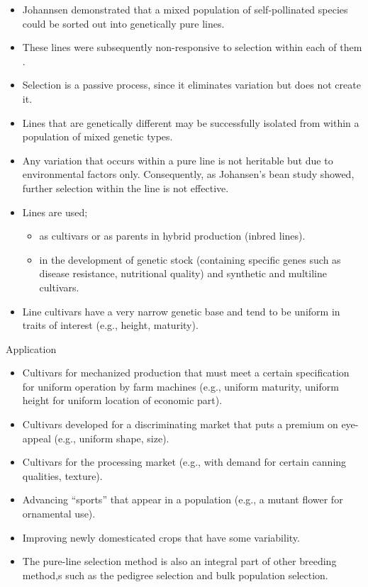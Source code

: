 \documentclass[11pt,ignorenonframetext,aspectratio=169]{beamer}
\providecommand{\tightlist}{%
  \setlength{\itemsep}{0pt}\setlength{\parskip}{0pt}}
\begin{document}
\begin{frame}{}
\protect\hypertarget{section-9}{}
\begin{itemize}
\tightlist
\item
  Johannsen demonstrated that a mixed population of self-pollinated
  species could be sorted out into genetically pure lines.
\item
  These lines were subsequently non-responsive to selection within each
  of them .
\item
  Selection is a passive process, since it eliminates variation but does
  not create it.
\item
  Lines that are genetically different may be successfully isolated from
  within a population of mixed genetic types.
\item
  Any variation that occurs within a pure line is not heritable but due
  to environmental factors only. Consequently, as Johansen's bean study
  showed, further selection within the line is not effective.
\item
  Lines are used;

  \begin{itemize}
  \tightlist
  \item
    as cultivars or as parents in hybrid production (inbred lines).
  \item
    in the development of genetic stock (containing specific genes such
    as disease resistance, nutritional quality) and synthetic and
    multiline cultivars.
  \end{itemize}
\item
  Line cultivars have a very narrow genetic base and tend to be uniform
  in traits of interest (e.g., height, maturity).
\end{itemize}
\end{frame}

\begin{frame}{Application}
\protect\hypertarget{application}{}
\begin{itemize}
\tightlist
\item
  Cultivars for mechanized production that must meet a certain
  specification for uniform operation by farm machines (e.g., uniform
  maturity, uniform height for uniform location of economic part).
\item
  Cultivars developed for a discriminating market that puts a premium on
  eye-appeal (e.g., uniform shape, size).
\item
  Cultivars for the processing market (e.g., with demand for certain
  canning qualities, texture).
\item
  Advancing ``sports'' that appear in a population (e.g., a mutant
  flower for ornamental use).
\item
  Improving newly domesticated crops that have some variability.
\item
  The pure-line selection method is also an integral part of other
  breeding method,s such as the pedigree selection and bulk population
  selection.
\end{itemize}
\end{frame}
\end{document}
